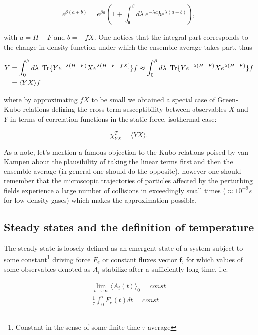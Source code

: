 \documentclass[a4paper,12pt]{article}
\begin{document}
\begin{equation}
  e^{\beta (a+b) }=e^{\beta a} (1+\int_0^{\beta} d\lambda\ e^{-\lambda a} b e^{\lambda (a+b)}),
\end{equation}

with $a=H-F$ and $b=-f X$. One notices that the integral part corresponds to the change in density function under which the ensemble average takes part, thus

\begin{equation}
\begin{aligned}
  \bar{Y} &= \int_0^{\beta} d\lambda\ \Tr\{ Y e^{-\lambda (H - F)} X e^{\lambda (H-F-f X)} \} f \approx  \int_0^{\beta} d\lambda\ \Tr\{ Y e^{-\lambda (H - F)} X e^{\lambda (H-F)} \} f \\
  &= \langle Y X \rangle f
\end{aligned}
\end{equation}

where by approximating $f X$ to be small we obtained a special case of Green-Kubo relations defining the cross term susceptibility between observables $X$ and $Y$ in terms of correlation functions in the static force, isothermal case:

\begin{equation}
  \chi_{YX}^T = \langle Y X \rangle.
\end{equation}

As a note, let's mention a famous objection to the Kubo relations poised by van Kampen about the plausibility of taking the linear terms first and then the ensemble average (in general one should do the opposite), however one should remember that the microscopic trajectories of particles affected by the perturbing fields experience a large number of collisions in exceedingly small times ($\approx 10^{-9}s$ for low density gases) which makes the approximation possible\cite{Dorfman:ozm67-zD}.
\subsection{Steady states and the definition of temperature}

The steady state is loosely defined as an emergent state of a system subject to some constant\footnote{Constant in the sense of some finite-time $\tau$ average} driving force $F_e$ or constant fluxes vector $\bm{f}$, for which values of some observables denoted as $A_i$ stabilize after a sufficiently long time, i.e.

\begin{equation}
\begin{aligned}
  \lim_{t \to \infty} \langle A_i(t) \rangle_0 = const\\
  \frac{1}{\tau} \int_0^{\tau} F_e(t) dt =const
\end{aligned}
\end{equation}
\end{document}
